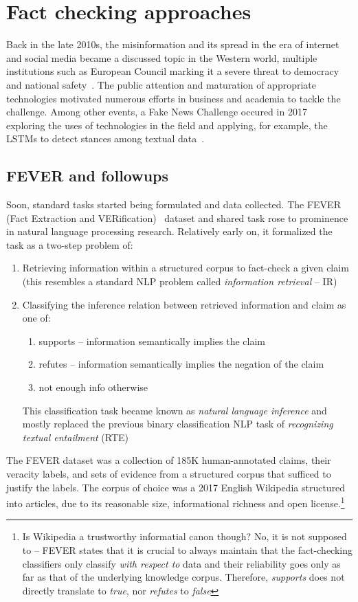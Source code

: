 \section{Fact checking approaches}
Back in the late 2010s, the misinformation and its spread in the era of internet and social media became a discussed topic in the Western world, multiple institutions such as European Council marking it a severe threat to democracy and national safety~\cite{disorder}.
The public attention and maturation of appropriate technologies motivated numerous efforts in business and academia to tackle the challenge.
Among other events, a Fake News Challenge occured in 2017~\cite{fncweb} exploring the uses of technologies in the field and applying, for example, the LSTMs to detect stances among textual data~\cite{fnc}.

\subsection{FEVER and followups}
Soon, standard tasks started being formulated and data collected. 
The FEVER (Fact Extraction and VERification)~\cite{fever} dataset and shared task rose to prominence in natural language processing research.
Relatively early on, it formalized the task as a two-step problem of:
\begin{enumerate}
    \item Retrieving information within a structured corpus to fact-check a given claim (this resembles a standard NLP problem called \textit{information retrieval} -- IR)
    \item Classifying the inference relation between retrieved information and claim as one of:
    \begin{enumerate}
        \item {\techbf supports} -- information semantically implies the claim 
        \item {\techbf refutes} -- information semantically implies the negation of the claim 
        \item {\techbf not enough info} otherwise 
    \end{enumerate}
    This classification task became known as \textit{natural language inference} and mostly replaced the previous binary classification NLP task of \textit{recognizing textual entailment} (RTE)
\end{enumerate}

The FEVER dataset was a collection of 185K human-annotated claims, their veracity labels, and sets of evidence from a structured corpus that sufficed to justify the labels.
The corpus of choice was a 2017 English Wikipedia structured into articles, due to its reasonable size, informational richness and open license.\footnote{Is Wikipedia a trustworthy informatial canon though? 
No, it is not supposed to -- FEVER states that it is crucial to always maintain that the fact-checking classifiers only classify \textit{with respect to} data and their reliability goes only as far as that of the underlying knowledge corpus. Therefore, \textit{supports} does not directly translate to \textit{true}, nor \textit{refutes} to \textit{false}}

